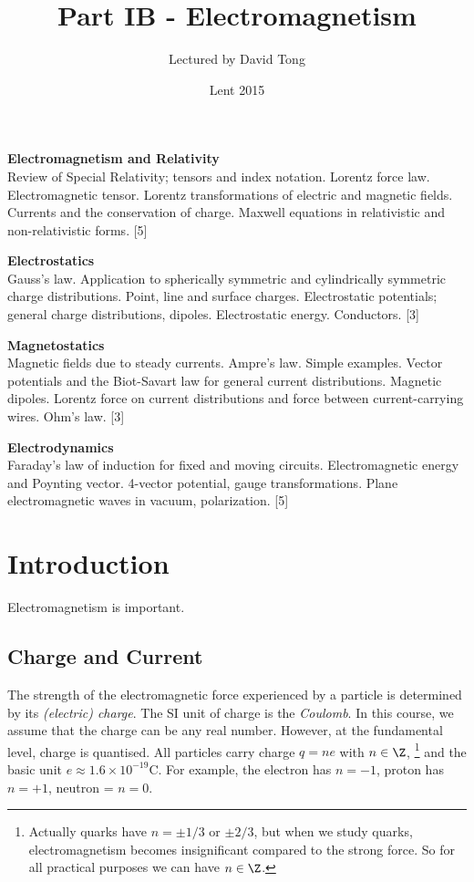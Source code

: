 \documentclass[a4paper]{article}
\title{Part IB - Electromagnetism}
\author{Lectured by David Tong}
\date{Lent 2015}
\begin{document}
\maketitle
{\small
\noindent\textbf{Electromagnetism and Relativity}\\
Review of Special Relativity; tensors and index notation. Lorentz force law. Electromagnetic tensor. Lorentz transformations of electric and magnetic fields. Currents and the conservation of charge. Maxwell equations in relativistic and non-relativistic forms.\hspace*{\fill} [5]

\vspace{10pt}
\noindent\textbf{Electrostatics}\\
Gauss's law. Application to spherically symmetric and cylindrically symmetric charge distributions.  Point, line and surface charges. Electrostatic potentials; general charge distributions, dipoles. Electrostatic energy. Conductors.\hspace*{\fill} [3]

\vspace{10pt}
\noindent\textbf{Magnetostatics}\\
Magnetic fields due to steady currents. Ampre's law. Simple examples. Vector potentials and the Biot-Savart law for general current distributions. Magnetic dipoles. Lorentz force on current distributions and force between current-carrying wires. Ohm's law.\hspace*{\fill} [3]

\vspace{10pt}
\noindent\textbf{Electrodynamics}\\
Faraday's law of induction for fixed and moving circuits. Electromagnetic energy and Poynting vector.  4-vector potential, gauge transformations. Plane electromagnetic waves in vacuum, polarization.\hspace*{\fill} [5]}

\tableofcontents
\section{Introduction}
Electromagnetism is important.
\subsection{Charge and Current}
The strength of the electromagnetic force experienced by a particle is determined by its \emph{(electric) charge}. The SI unit of charge is the \emph{Coulomb}. In this course, we assume that the charge can be any real number. However, at the fundamental level, charge is quantised. All particles carry charge $q = ne$ with $n\in \Z$, \footnote{Actually quarks have $n = \pm1/3$ or $\pm2/3$, but when we study quarks, electromagnetism becomes insignificant compared to the strong force. So for all practical purposes we can have $n\in \Z$.} and the basic unit $e \approx 1.6 \times 10^{-19} $C. For example, the electron has $n = -1$, proton has $n = +1$, neutron = $n = 0$.
\end{document}
